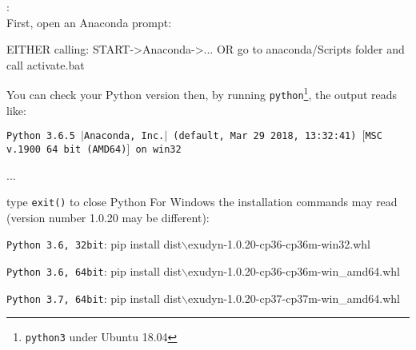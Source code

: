 \noindent {}:\vspace{6pt}\\
First, open an Anaconda prompt:
\bi
  \item EITHER calling: START->Anaconda->... OR go to anaconda/Scripts folder and call activate.bat
  \item You can check your Python version then, by running \texttt{python}\footnote{\texttt{python3} under Ubuntu 18.04}, the output reads like:
  \bi
    \item[] \texttt{Python 3.6.5 $|$Anaconda, Inc.$|$ (default, Mar 29 2018, 13:32:41) $[$MSC v.1900 64 bit (AMD64)$]$ on win32}
    \item[] ...
  \ei
  \item type \texttt{exit()} to close Python
\ei
%
%
For Windows the installation commands may read (version number 1.0.20 may be different):
\bi
  \item \texttt{Python 3.6, 32bit}: pip install dist$\backslash$exudyn-1.0.20-cp36-cp36m-win32.whl
  \item \texttt{Python 3.6, 64bit}: pip install dist$\backslash$exudyn-1.0.20-cp36-cp36m-win\_amd64.whl
  \item \texttt{Python 3.7, 64bit}: pip install dist$\backslash$exudyn-1.0.20-cp37-cp37m-win\_amd64.whl
\ei

%


